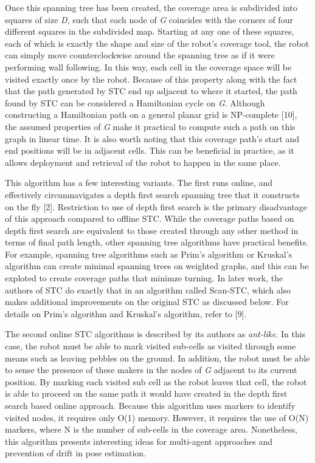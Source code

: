\documentclass[letterpaper, 12pt, leqno]{report}
\begin{document}
Once this spanning tree has been created, the coverage area is subdivided into squares of size \textit{D}, such that each node of \textit{G} coincides with the corners of four different squares in the subdivided map. Starting at any one of these squares, each of which is exactly the shape and size of the robot's coverage tool, the robot can simply move counterclockwise around the spanning tree as if it were performing wall following. In this way, each cell in the coverage space will be visited exactly once by the robot. Because of this property along with the fact that the path generated by STC end up adjacent to where it started, the path found by STC can be considered a Hamiltonian cycle on \textit{G}. Although constructing a Hamiltonian path on a general planar grid is NP-complete [10], the assumed properties of \textit{G} make it practical to compute such a path on this graph in linear time. It is also worth noting that this coverage path's start and end positions will be in adjacent cells. This can be beneficial in practice, as it allows deployment and retrieval of the robot to happen in the same place.


This algorithm has a few interesting variants. The first runs online, and effectively circumnavigates a depth first search spanning tree that it constructs on the fly [2]. Restriction to use of depth first search is the primary disadvantage of this approach compared to offline STC. While the coverage paths based on depth first search are equivalent to those created through any other method in terms of final path length, other spanning tree algorithms have practical benefits. For example, spanning tree algorithms such as Prim's algorithm or Kruskal's algorithm can create minimal spanning trees on weighted graphs, and this can be exploted to create coverage paths that minimze turning. In later work, the authors of STC do exactly that in an algorithm called Scan-STC, which also makes additional improvements on the original STC as discussed below. For details on Prim's algorithm and Kruskal's algorithm, refer to [9]. 

The second online STC algorithms is described by its authors as \textit{ant-like}. In this case, the robot must be able to mark visited sub-cells as visited through some means such as leaving pebbles on the ground. In addition, the robot must be able to sense the presence of these makers in the nodes of \textit{G} adjacent to its current position. By marking each visited sub cell as the robot leaves that cell, the robot is able to proceed on the same path it would have created in the depth first search based online approach. Because this algorithm uses markers to identify visited nodes, it requires only O(1) memory. However, it requires the use of O(N) markers, where N is the number of sub-cells in the coverage area. Nonetheless, this algorithm presents interesting ideas for multi-agent approaches and prevention of drift in pose estimation.
\end{document}
